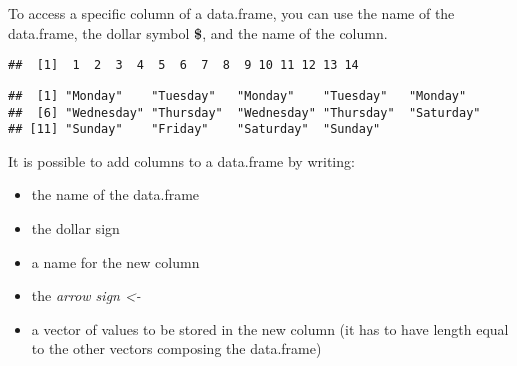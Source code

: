 \documentclass[
]{article}
\newenvironment{Shaded}{\begin{snugshade}}{\end{snugshade}}
\newcommand{\DecValTok}[1]{\textcolor[rgb]{0.00,0.00,0.81}{#1}}
\newcommand{\FunctionTok}[1]{\textcolor[rgb]{0.13,0.29,0.53}{\textbf{#1}}}
\newcommand{\NormalTok}[1]{#1}
\newcommand{\OtherTok}[1]{\textcolor[rgb]{0.56,0.35,0.01}{#1}}
\newcommand{\SpecialCharTok}[1]{\textcolor[rgb]{0.81,0.36,0.00}{\textbf{#1}}}
\providecommand{\tightlist}{%
  \setlength{\itemsep}{0pt}\setlength{\parskip}{0pt}}
\begin{document}
To access a specific column of a data.frame, you can use the name of the data.frame, the dollar symbol \textbf{\$}, and the name of the column.

\begin{Shaded}
\end{Shaded}

\begin{verbatim}
##  [1]  1  2  3  4  5  6  7  8  9 10 11 12 13 14
\end{verbatim}

\begin{Shaded}
\end{Shaded}

\begin{verbatim}
##  [1] "Monday"    "Tuesday"   "Monday"    "Tuesday"   "Monday"   
##  [6] "Wednesday" "Thursday"  "Wednesday" "Thursday"  "Saturday" 
## [11] "Sunday"    "Friday"    "Saturday"  "Sunday"
\end{verbatim}

It is possible to add columns to a data.frame by writing:

\begin{itemize}
\tightlist
\item
  the name of the data.frame
\item
  the dollar sign
\item
  a name for the new column
\item
  the \emph{arrow sign \textless-}
\item
  a vector of values to be stored in the new column (it has to have length equal to the other vectors composing the data.frame)
\end{itemize}

\begin{Shaded}
\end{Shaded}
\end{document}

